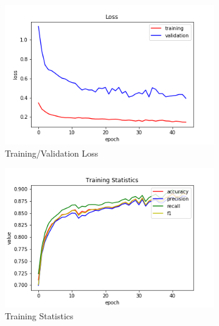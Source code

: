 \begin{figure}[h!]
  \centerfloat
  \begin{subfigure}[b]{0.35\linewidth}
    \includegraphics[width=\linewidth]{images/cae_online_lstm/caelstm_section_lstm_training_house_10000_model_loss.png}
     \caption{Training/Validation Loss}
  \end{subfigure}
  \hfill
  \begin{subfigure}[b]{0.35\linewidth}
    \includegraphics[width=\linewidth]{images/cae_online_lstm/caelstm_section_lstm_training_house_10000_model_training_stats.png}
     \caption{Training Statistics}
  \end{subfigure}
  \hfill
  \begin{subfigure}[b]{0.35\linewidth}

\end{subfigure}
\end{figure}
